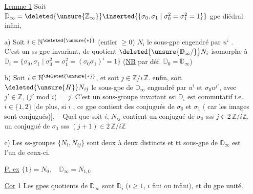 \uline{Lemme 1} Soit $\mathbb D_\infty=\deleted{\unsure{\mathbb Z_\infty}}\inserted{\{\sigma_0,\sigma_1\mid\sigma_0^2=\sigma_1^2=1\}}$ gpe diédral infini,  
 

a) Soit $i\in\mathbb N^{\deleted{\unsure{*}}}$ (entier $\geq0$) 
 $N_i$ le sous-gpe engendré
par $u^i$ . C'est un ss-gpe invariant,  de quotient $\deleted{\unsure{\mathbb D_\infty/}}N_i$
isomorphe à $\mathbb D_i=\{\sigma_0,\sigma_1\mid\sigma_0^2=\sigma_1^2=(\sigma_0\sigma_1)^i=1\}$ (\uline{NB} par déf. $\mathbb D_0=\mathbb D_\infty$)

b) 
Soit $i\in\mathbb N^{\deleted{\unsure{*}}}$, et soit $j\in\mathbb Z/i\,\mathbb Z$. 
enfin, soit $\deleted{\unsure{H}}N_{ij}$ le sous-gpe de $\mathbb D_\infty$ engendré par
$u^i$ et $\sigma_0u^{j'}$, avec $j'\in\mathbb Z$, ($j'$ mod $i$) $=j$. C'est un sous-groupe
 invariant ssi $\mathbb D_i$ est commutatif i.e. $i\in\{1,2\}$ 
 
[de plus, si $i$ , ce gpe contient des conjugués de $\sigma_0$ et $\sigma_1$ ( car les images sont conjugués)]. --
 Quel que soit $i$, $N_{ij}$ contient un conjugué
de $\sigma_0$ sss $j\in2\,\mathbb Z/i\mathbb Z$, un conjugué de $\sigma_1$ sss $(j+1)\in2\,\mathbb Z/i\mathbb Z$

c) Les ss-groupes $\{N_i,N_{ij}\}$ sont deux à deux distincts
et tt sous-gpe de $\mathbb D_\infty$ est l'un de ceux-ci.

\uline{P. ex} $\{1\}=N_0,\quad\mathbb D_\infty=N_{1,0}$

\uline{Cor} 1 Les  gpes quotients de $\mathbb D_\infty$ sont  $\mathbb D_i$ ($i\geq1$, $i$
fini ou infini), \deleted{\unsure{$+$}} et  du gpe unité.

